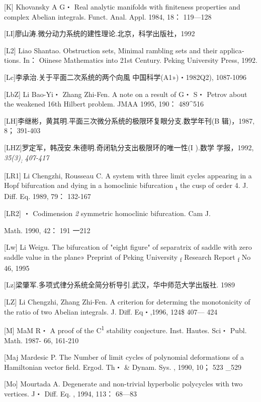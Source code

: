 \documentclass{article}
\begin{document}
{[}K{]} Khovansky A G・ Real analytic manifolds with finiteness
properties and complex Abelian integrals. Funct. Anal. Appl. 1984, 18：
119---128

{[}LI{]}廖山涛.微分动力系统的建性理论.北京，科学出版社，1992

{[}L2{]} Liao Shantao. Obstruction sets, Minimal rambling sets and their
applica­tions. In： Oiinese Mathematics into 21st Century. Peking
University Press, 1992.

{[}Lc{]}李承治.关于平面二次系统的两个向風 中国科学(A1»)・1982Q2),
1087-1096

{[}LbZ{]} Li Bao-Yi・ Zhang Zhi-Fen. A note on a result of G・ S・
Petrov about the weakened 16th Hilbert problem. JMAA 1995, 190：
489\^{}516

{[}LH{]}李继彬，黄其明.平面三次微分系统的极限环复眼分支.数学年刊(B
辑)，1987, 8； 391-403

{[}LHZ{]}罗定军，韩茂安.朱德明.奇闭轨分支出极限环的唯一性(I ).数学
学报，1992, \emph{35(3)\textsubscript{;} 407-417}

{[}LR1{]} Li Chengzhi, Rousseau C. A system with three limit cycles
appearing in a Hopf bifurcation and dying in a homoclinic bifurcation
\textsubscript{t} the cusp of order 4. J. Diff. Eq. 1989, 79： 132-167

{[}LR2{]} ・ Codimension \emph{2} symmetric homoclinic bifurcation. Cam
J.

Math. 1990, 42： 191 一212

{[}Lw{]} Li Weigu. The bifurcation of "eight figure" of separatrix of
saddle with zero saddle value in the plane» Preprint of Peking
University \textsubscript{f} Research Report \textsubscript{f} No 46,
1995

{[}Lz{]}梁肇军.多项式律分系统全简分析导引.武汉，华中师范大学出版社. 1989

{[}LZ{]} Li Chengzhi, Zhang Zhi-Fen. A criterion for determing the
monotonici­ty of the ratio of two Abelian integrals. J. Diff. Eq・,1996,
124\$ 407--- 424

{[}M{]} MaM R・ A proof of the C\textsuperscript{1} stability
conjecture. Inst. Hautes. Sci・ Publ. Math. 1987- 66, 161-210

{[}Maj Mardesic P. The Number of limit cycles of polynomial deformations
of a Hamiltonian vector field. Ergod. Th・ \& Dynam. Sys. , 1990, 10；
523 \_529

{[}Mo{]} Mourtada A. Degenerate and non-trivial hyperbolic polycycles
with two vertices. J・ Diff. Eq. , 1994, 113： 68---83
\end{document}
